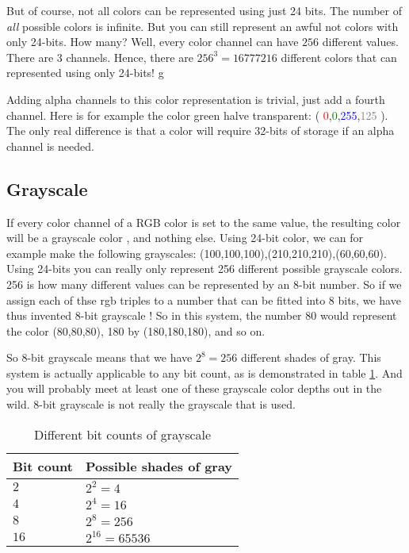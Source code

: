 \begin{refsection}
  But of course, not all colors can be represented using just
  24 bits. The number of \textit{all} possible colors is infinite. But you can still
  represent an awful not colors with only 24-bits. How many? Well, every
  color channel can have $256$ different values. There are $3$
  channels. Hence, there are $256^3 = 16777216$ different colors that
  can represented using only 24-bits!
g
  \newcommand{\rgbaquad}[4]{(
    \textcolor{red}{#1},\textcolor{green}{#2},\textcolor{blue}{#3},\textcolor{gray}{#4} )}

  Adding alpha channels to this color representation is trivial, just
  add a fourth channel. Here is for example the color green halve
  transparent: \rgbaquad{0}{0}{255}{125}. The only real difference is
  that a color will require 32-bits of storage if an alpha channel is needed.

  \subsection{Grayscale}
  \label{sec:other-colors-depths}

  \newcommand{\selfrgbtrip}[3]{\textcolor[RGB]{#1,#2,#3}{(#1,#2,#3)}}
  \newcommand{\selfrgbtripgray}[1]{\selfrgbtrip{#1}{#1}{#1}}

  If every color channel of a RGB color is set to the same value, the
  resulting color will be a grayscale color ,
  and nothing else. Using 24-bit color, we can for example make the
  following grayscales:
  \selfrgbtripgray{100},\selfrgbtripgray{210},\selfrgbtripgray{60}. Using
  24-bits you can really only represent 256 different possible
  grayscale colors. 256 is how many different values can be
  represented by an 8-bit number. So if we assign each of thse rgb
  triples to a number that can be fitted into 8 bits, we have thus
  invented 8-bit grayscale ! So in this system,
  the number 80 would represent the color \selfrgbtripgray{80}, 180 by
  \selfrgbtripgray{180}, and so on. \cite{puglia00:_handbook_dig_proj}

  So 8-bit grayscale means that we have $2^8=256$ different shades of
  gray. This system is actually applicable to any bit count, as is
  demonstrated in table \ref{tab:grayscale}. And you will probably meet at least one of
  these grayscale color depths out in the wild. 8-bit grayscale is not
  really the grayscale that is used.

  \begin{table}[h!]
    \centering
    \begin{tabular}{ll}
      \toprule
      Bit count & Possible shades of gray \\
      \midrule
      $2$ & $2^2 = 4$ \\
      $4$ & $2^4 = 16$ \\
      $8$ & $2^8 = 256$ \\
      $16$ & $2^{16} = 65536$ \\
      \bottomrule
    \end{tabular}
    \caption{Different bit counts of grayscale}
    \label{tab:grayscale}
  \end{table}


\end{refsection}
